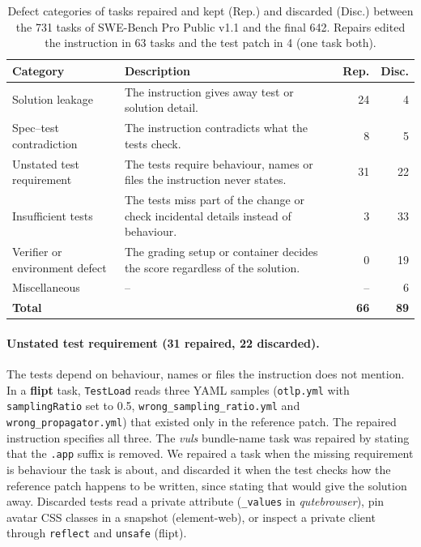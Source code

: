 \begin{table}[t]
\centering
\small
\setlength{\tabcolsep}{3pt}
\begin{tabularx}{\columnwidth}{@{}>{\raggedright\arraybackslash}p{2.05cm} >{\raggedright\arraybackslash}X r r@{}}
\toprule
\textbf{Category} & \textbf{Description} & \textbf{Rep.} & \textbf{Disc.} \\
\midrule
Solution leakage & The instruction gives away test or solution detail. & 24 & 4 \\
\addlinespace
Spec--test contradiction & The instruction contradicts what the tests check. & 8 & 5 \\
\addlinespace
Unstated test requirement & The tests require behaviour, names or files the instruction never states. & 31 & 22 \\
\addlinespace
Insufficient tests & The tests miss part of the change or check incidental details instead of behaviour. & 3 & 33 \\
\addlinespace
Verifier or environment defect & The grading setup or container decides the score regardless of the solution. & 0 & 19 \\
\addlinespace
Miscellaneous & -- & -- & 6 \\
\midrule
\textbf{Total} & & \textbf{66} & \textbf{89} \\
\bottomrule
\end{tabularx}
\caption{Defect categories of tasks repaired and kept (Rep.) and discarded (Disc.) between the 731 tasks of SWE-Bench Pro Public v1.1 and the final 642. Repairs edited the instruction in 63 tasks and the test patch in 4 (one task both).}
\label{tab:repairs-discards}
\end{table}



\paragraph{Unstated test requirement (31 repaired, 22 discarded).}
The tests depend on behaviour, names or files the instruction does not mention. In a \textbf{flipt} task, \texttt{TestLoad} reads three YAML samples (\texttt{otlp.yml} with \texttt{samplingRatio} set to 0.5, \texttt{wrong\_sampling\_ratio.yml} and \texttt{wrong\_propagator.yml}) that existed only in the reference patch. The repaired instruction specifies all three. The \textit{vuls} bundle-name task was repaired by stating that the \texttt{.app} suffix is removed. We repaired a task when the missing requirement is behaviour the task is about, and discarded it when the test checks how the reference patch happens to be written, since stating that would give the solution away. Discarded tests read a private attribute (\texttt{\_values} in \textit{qutebrowser}), pin avatar CSS classes in a snapshot (element-web), or inspect a private client through \texttt{reflect} and \texttt{unsafe} (flipt). 

